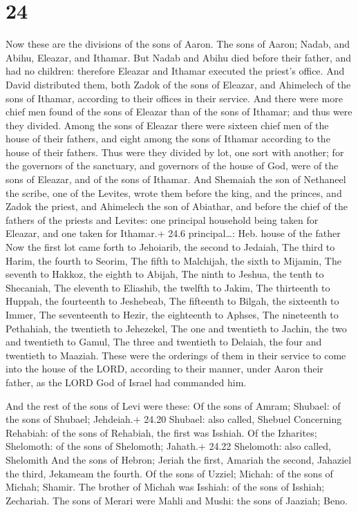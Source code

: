 \hypertarget{section-23}{%
\section{24}\label{section-23}}

 Now these are the divisions of the sons of Aaron. The sons
of Aaron; Nadab, and Abihu, Eleazar, and Ithamar.  But Nadab
and Abihu died before their father, and had no children: therefore
Eleazar and Ithamar executed the priest's office.  And David
distributed them, both Zadok of the sons of Eleazar, and Ahimelech of
the sons of Ithamar, according to their offices in their service.
 And there were more chief men found of the sons of Eleazar
than of the sons of Ithamar; and thus were they divided. Among the sons
of Eleazar there were sixteen chief men of the house of their fathers,
and eight among the sons of Ithamar according to the house of their
fathers.  Thus were they divided by lot, one sort with
another; for the governors of the sanctuary, and governors of the house
of God, were of the sons of Eleazar, and of the sons of Ithamar.
 And Shemaiah the son of Nethaneel the scribe, one of the
Levites, wrote them before the king, and the princes, and Zadok the
priest, and Ahimelech the son of Abiathar, and before the chief of the
fathers of the priests and Levites: one principal household being taken
for Eleazar, and one taken for Ithamar.+ 24.6 principal\ldots: Heb.
house of the father  Now the first lot came forth to
Jehoiarib, the second to Jedaiah,  The third to Harim, the
fourth to Seorim,  The fifth to Malchijah, the sixth to
Mijamin,  The seventh to Hakkoz, the eighth to Abijah,
 The ninth to Jeshua, the tenth to Shecaniah, 
The eleventh to Eliashib, the twelfth to Jakim,  The
thirteenth to Huppah, the fourteenth to Jeshebeab,  The
fifteenth to Bilgah, the sixteenth to Immer,  The
seventeenth to Hezir, the eighteenth to Aphses,  The
nineteenth to Pethahiah, the twentieth to Jehezekel,  The
one and twentieth to Jachin, the two and twentieth to Gamul,
 The three and twentieth to Delaiah, the four and twentieth
to Maaziah.  These were the orderings of them in their
service to come into the house of the LORD, according to their manner,
under Aaron their father, as the LORD God of Israel had commanded him.

 And the rest of the sons of Levi were these: Of the sons
of Amram; Shubael: of the sons of Shubael; Jehdeiah.+ 24.20 Shubael:
also called, Shebuel  Concerning Rehabiah: of the sons of
Rehabiah, the first was Isshiah.  Of the Izharites;
Shelomoth: of the sons of Shelomoth; Jahath.+ 24.22 Shelomoth: also
called, Shelomith  And the sons of Hebron; Jeriah the
first, Amariah the second, Jahaziel the third, Jekameam the fourth.
 Of the sons of Uzziel; Michah: of the sons of Michah;
Shamir.  The brother of Michah was Isshiah: of the sons of
Isshiah; Zechariah.  The sons of Merari were Mahli and
Mushi: the sons of Jaaziah; Beno.

